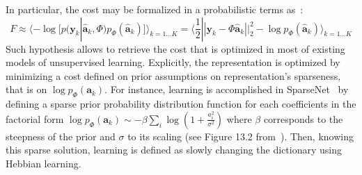 \documentclass[draft]{article} %
\newcommand{\coef}{\mathbf{a}} %
\newcommand{\image}{\mathbf{y}} %
\newcommand{\dico}{\Phi} %
\newcommand{\norm}[1]{|\!| #1 |\!|}
\begin{document}
In particular, the cost %
may be formalized in a probabilistic terms as~\citep{Olshausen97}:
\begin{equation} F \approx \langle - \log [ p(\image_k | \hat{\coef}_{k}, \dico ) p_\dico(\hat{\coef}_{k}) ]\rangle_{k = 1 \ldots K} = \langle \frac{1}{2} \norm{\image_k - \dico \hat{\coef}_{k}}_2^2 - \log p_\dico(\hat{\coef}_{k})\rangle_{k = 1 \ldots K} \label{eq:sparse_cost} \end{equation}
Such hypothesis allows to retrieve the cost that is optimized in most of existing models of unsupervised learning. Explicitly, the representation is optimized by minimizing a cost defined on prior assumptions on representation's sparseness, that is on $\log p_\dico( \coef_{k} )$. For instance, learning is accomplished in {\sc SparseNet}~\citep{Olshausen97} by defining a sparse prior probability distribution function for each coefficients in the factorial form $\log p_\dico(\coef_{k}) \sim -\beta \sum_i \log ( 1 + \frac{a_i^2}{\sigma^2} )$ where $\beta$ corresponds to the steepness of the prior and $\sigma$ to its scaling (see Figure 13.2 from~\citep{Olshausen02}). Then, knowing this sparse solution, learning is defined as slowly changing the dictionary using Hebbian learning.
\end{document}
